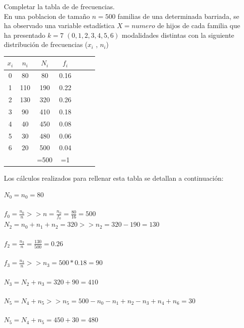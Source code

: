 \subproblem
Completar la tabla de de  frecuencias.
\\

En una poblacion de tamaño $n = 500$ familias de una determinada barriada, se ha observado una variable estadística $ X = numero$  de hijos de cada familia que ha presentado $k = 7$ $(0,1,2,3,4,5,6)$ modalidades distintas con la siguiente distribución de frecuencias ($x_{i}$ , $n_{i}$)
	\begin{center}
		\begin{tabular}{ | c | c | c | c | c | c | c | }
	
	
	\hline	
	$x_{i}$ & $n_{i}$ & $N_{i}$ & $f_{i}$ \\ \hline
	0 & 80 & 80  & 0.16 \\
	1 & 110 & 190  & 0.22  \\
	2 & 130 & 320 & 0.26 \\
	3 & 90 & 410  & 0.18 \\ 
	4 & 40 & 450  & 0.08  \\
	5 & 30 & 480 & 0.06 \\
	6 & 20 & 500 & 0.04 \\\hline
	 &  & =500 & =1 \\\hline
	 
\end{tabular}
	\end{center}

Los cálculos realizados para rellenar esta tabla se detallan a continuación: 

		$ N_{0} = n_{0} = 80 $\\ \\
		$ f_{0} = \frac{n_{0}}{n}  >> n = \frac{n_{0}}{f_{0}} =  \frac{80}{16} = 500 $\\ 
		$ N_{2} = n_{0} + n_{1} + n_{2} = 320  >> n_{2} = 320 - 190 = 130 $ \\ \\
		$ f_{2} = \frac{n_{2}}{n} = \frac{130}{500} = 0.26$\\ \\
		$ f_{3} = \frac{n_{3}}{n} >> n_{3} = 500 * 0.18 = 90 $\\ \\
		$ N_{3} =N_{2} + n_{3} = 320 + 90 = 410  $\\ \\
		$ N_{5} =N_{4} + n_{5}  >>  n_{5}= 500 - n_{0} - n_{1} + n_{2} -n_{3} + n_{4} + n_{6} = 30 $ \\ \\
		$ N_{5} =N_{4} + n_{5} = 450 + 30 = 480 $\\ 
		
